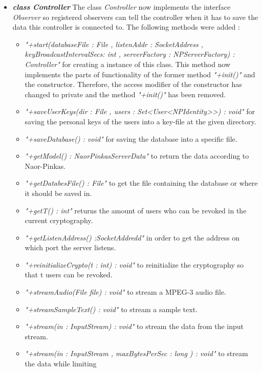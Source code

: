 \documentclass[a4paper,10pt]{scrartcl}
\begin{document}
\begin{itemize}
  
\item \textbf{\textit{class Controller}} \newline
The class \textit{Controller} now implements the interface \textit{Observer} so registered observers can 
tell the controller when it has to save the data this controller is connected to.
The following methods were added :
	\begin{itemize}
	 \item \textit{"+start(databaseFile : File , listenAddr : SocketAddress , keyBroadcastIntervalSecs: int ,
		 serverFactory : NPServerFactory) : Controller"} for creating a instance of this class. This method now 
	 	implements the parts of functionality of the former method \textit{"+init()"}  and 
		the constructor. Therefore, the access modifier of the constructor has changed to private and the method  
		\textit{"+init()"} has been removed.
	 \item \textit{"+saveUserKeys(dir : File , users : Set<User<NPIdentity>>) : void"} for saving
		 the personal keys of the users into a key-file at the given directory.
	 \item \textit{"+saveDatabase() : void"} for saving the database into a specific file.
	 \item \textit{"+getModel() : NaorPinkasServerData"} to return the data according to Naor-Pinkas.
	 \item \textit{"+getDatabesFile() : File"} to get the file containing the database or where it should be saved in.
	\item \textit{"+getT() : int"} returns the amount of users who can be revoked in the current cryptography.
	\item \textit{"+getListenAddress() :SocketAddredd"} in order to get the address on which port the server listens.
	 \item \textit{"+reinitializeCrypto(t : int) : void"} to reinitialize the cryptography so that t users can be revoked.
	 \item \textit{"+streamAudio(File file) : void"} to stream a MPEG-3 audio file.
	 \item \textit{"+streamSampleText() : void"} to stream a sample text.
	 \item \textit{"+stream(in : InputStream) : void"} to stream the data from the input stream.
	 \item \textit{"+stream(in : InputStream , maxBytesPerSec : long ) : void"} to stream the data while limiting 

\end{itemize}
\end{itemize}
\end{document}
